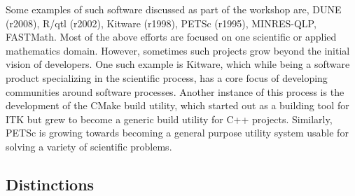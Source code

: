 \documentclass[11pt, oneside]{amsart}
\newcommand{\toolname}[1] {\textsf{#1}}
\begin{document}
Some examples of such software discussed as part of the workshop are,
\toolname{DUNE (r2008)}, \toolname{R/qtl (r2002)}, \toolname{Kitware (r1998)},
\toolname{PETSc (r1995)}, \toolname{MINRES-QLP}, \toolname{FASTMath}.  Most of
the above efforts are focused on one scientific or applied
mathematics domain. However, sometimes such projects grow beyond the
initial vision of developers. One such example is \toolname{Kitware},
which while being a software product specializing in the scientific
process, has a core focus of developing communities around software
processes. Another instance of this process is the development of the
\toolname{CMake} build utility, which started out as a building tool
for \toolname{ITK} but grew to become a generic build utility for C++
projects. Similarly, \toolname{PETSc} is growing towards becoming a
general purpose utility system usable for solving a variety of
scientific problems.


\subsection{Distinctions}
\end{document}
